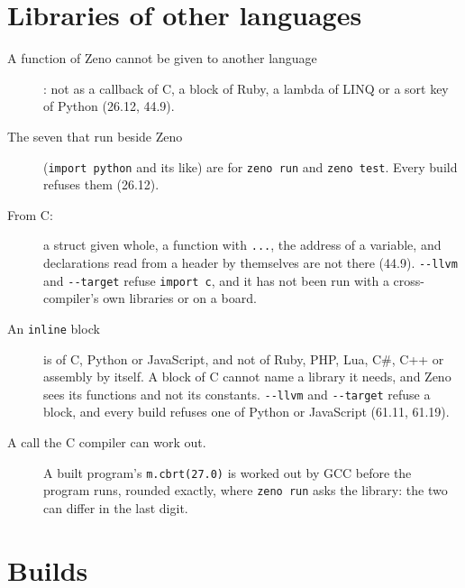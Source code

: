 \section{Libraries of other languages}

\begin{description}
\item[A function of Zeno cannot be given to another language]: not as
  a callback of C, a block of Ruby, a lambda of LINQ or a sort key of
  Python (26.12, 44.9).
\item[The seven that run beside Zeno] (\verb|import python| and its
  like) are for \verb|zeno run| and \verb|zeno test|. Every build
  refuses them (26.12).
\item[From C:] a struct given whole, a function with \verb|...|, the
  address of a variable, and declarations read from a header by
  themselves are not there (44.9). \verb|--llvm| and \verb|--target|
  refuse \verb|import c|, and it has not been run with a
  cross-compiler's own libraries or on a board.
\item[An \texttt{inline} block] is of C, Python or JavaScript, and
  not of Ruby, PHP, Lua, C\#, C++ or assembly by itself. A block of C
  cannot name a library it needs, and Zeno sees its functions and not
  its constants. \verb|--llvm| and \verb|--target| refuse a block,
  and every build refuses one of Python or JavaScript (61.11, 61.19).
\item[A call the C compiler can work out.] A built program's
  \verb|m.cbrt(27.0)| is worked out by GCC before the program runs,
  rounded exactly, where \verb|zeno run| asks the library: the two can
  differ in the last digit.
\end{description}

\section{Builds}

